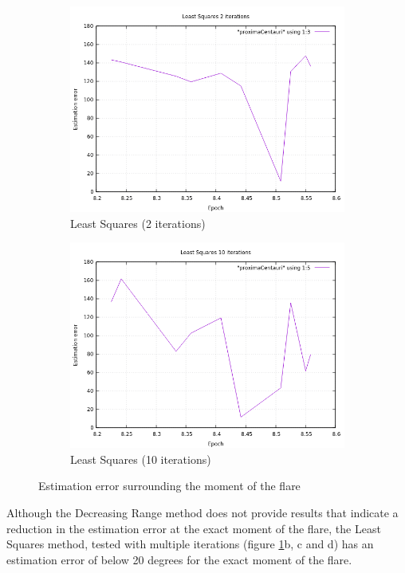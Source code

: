 \begin{figure}[!htb]
\begin{subfigure}[b]{0.5\textwidth}
		\includegraphics[width=\linewidth]{images/resultsStellar/proximaCentauri/LS2iters2Epochs10.png}
		\caption{Least Squares (2 iterations)}
	\end{subfigure}
	\hfill
	\begin{subfigure}[b]{0.5\textwidth}
		\includegraphics[width=\linewidth]{images/resultsStellar/proximaCentauri/LS10iters2Epochs10.png}
		\caption{Least Squares (10 iterations)}
	\end{subfigure}
	\caption{Estimation error surrounding the moment of the flare}
	\label{fig:proximaCentauri}
\end{figure}

Although the Decreasing Range method does not provide results that indicate a reduction in the estimation error at the exact moment of the flare, the Least Squares method, tested with multiple iterations (figure \ref{fig:proximaCentauri}b, c and d) has an estimation error of below 20 degrees for the exact moment of the flare. 

